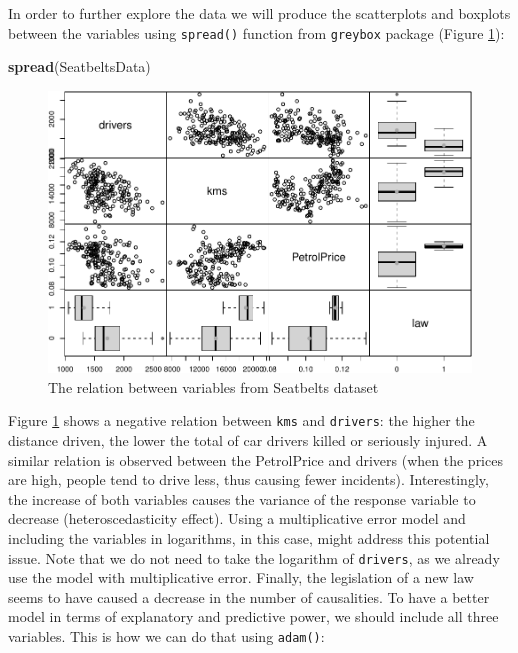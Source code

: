\documentclass[]{book}
\newenvironment{Shaded}{\begin{snugshade}}{\end{snugshade}}
\newcommand{\KeywordTok}[1]{\textcolor[rgb]{0.13,0.29,0.53}{\textbf{#1}}}
\newcommand{\NormalTok}[1]{#1}
\theoremstyle{definition}
\theoremstyle{definition}
\theoremstyle{definition}
\theoremstyle{definition}
\theoremstyle{remark}
\begin{document}
In order to further explore the data we will produce the scatterplots and boxplots between the variables using \texttt{spread()} function from \texttt{greybox} package (Figure \ref{fig:driversSpread}):

\begin{Shaded}
\begin{Highlighting}[]
\KeywordTok{spread}\NormalTok{(SeatbeltsData)}
\end{Highlighting}
\end{Shaded}

\begin{figure}
\centering
\includegraphics{Svetunkov--2022----ADAM_files/figure-latex/driversSpread-1.pdf}
\caption{\label{fig:driversSpread}The relation between variables from Seatbelts dataset}
\end{figure}

Figure \ref{fig:driversSpread} shows a negative relation between \texttt{kms} and \texttt{drivers}: the higher the distance driven, the lower the total of car drivers killed or seriously injured. A similar relation is observed between the PetrolPrice and drivers (when the prices are high, people tend to drive less, thus causing fewer incidents). Interestingly, the increase of both variables causes the variance of the response variable to decrease (heteroscedasticity effect). Using a multiplicative error model and including the variables in logarithms, in this case, might address this potential issue. Note that we do not need to take the logarithm of \texttt{drivers}, as we already use the model with multiplicative error. Finally, the legislation of a new law seems to have caused a decrease in the number of causalities. To have a better model in terms of explanatory and predictive power, we should include all three variables. This is how we can do that using \texttt{adam()}:
\end{document}
